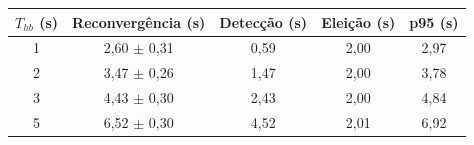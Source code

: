 \begin{tabular}{ccccc}
\toprule
$T_{hb}$ (s) & Reconvergência (s) & Detecção (s) & Eleição (s) & p95 (s) \\
\midrule
1 & 2,60 $\pm$ 0,31 & 0,59 & 2,00 & 2,97 \\
2 & 3,47 $\pm$ 0,26 & 1,47 & 2,00 & 3,78 \\
3 & 4,43 $\pm$ 0,30 & 2,43 & 2,00 & 4,84 \\
5 & 6,52 $\pm$ 0,30 & 4,52 & 2,01 & 6,92 \\
\bottomrule
\end{tabular}